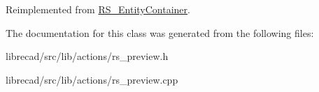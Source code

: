 Reimplemented from \hyperlink{classRS__EntityContainer_ada84ceb9590c74cd3b46134cdde40a3d}{R\-S\-\_\-\-Entity\-Container}.



The documentation for this class was generated from the following files\-:\begin{DoxyCompactItemize}
\item 
librecad/src/lib/actions/rs\-\_\-preview.\-h\item 
librecad/src/lib/actions/rs\-\_\-preview.\-cpp\end{DoxyCompactItemize}

